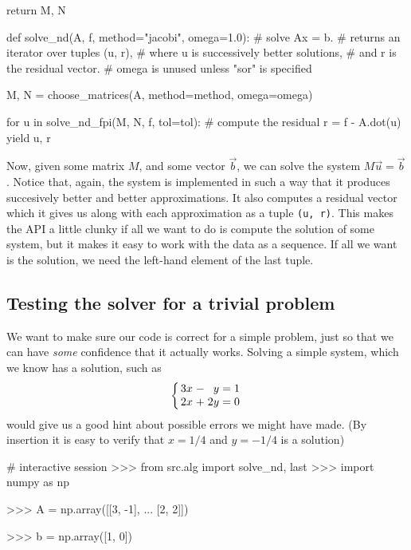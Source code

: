 \documentclass[12pt]{article}
\begin{document}
\begin{multicols}{2}
\begin{python}[
        caption={Argument-``parser'' and choice of $M$, $N$.}
    ]
    return M, N


def solve_nd(A, f, method="jacobi", omega=1.0):
    # solve Ax = b.
    # returns an iterator over tuples (u, r),
    # where u is successively better solutions,
    # and r is the residual vector.
    # omega is unused unless "sor" is specified

    M, N = choose_matrices(A,
                           method=method,
                           omega=omega)

    for u in solve_nd_fpi(M, N, f, tol=tol):
        # compute the residual
        r = f - A.dot(u)
        yield u, r
    \end{python}
    Now, given some matrix $M$, and some vector $\vec b$,
    we can solve the system $M\vec u = \vec b$.
    Notice that, again, the system is implemented in such a way that it
    produces succesively better and better approximations.
    It also computes a residual vector which it gives us along with
    each approximation as a tuple {\tt (u, r)}.
    This makes the API a little clunky if all we want to do is
    compute the solution of some system, but it makes it easy to
    work with the data as a sequence.
    If all we want is the solution, we need the left-hand element of
    the last tuple.

    \subsection*{Testing the solver for a trivial problem}
    We want to make sure our code is correct for a simple problem,
    just so that we can have {\em some} confidence that it actually
    works.
    Solving a simple system, which we know has a solution,
    such as
    \[
        \arraycolsep=1.4pt\def\arraystretch{1}
        \left\{\begin{array}{rcrcr}
            3x &-&  y &=&  1 \\
            2x &+& 2y &=&  0 \\
        \end{array}\right.
    \]
    would give us a good hint about possible errors we might have made.
    (By insertion it is easy to verify that $x = 1/4$ and $y = -1/4$ is a solution)
    \begin{python}
# interactive session
>>> from src.alg import solve_nd, last
>>> import numpy as np

>>> A = np.array([[3, -1],
...               [2,  2]])

>>> b = np.array([1, 0])


\end{python}
\end{multicols}
\end{document}
